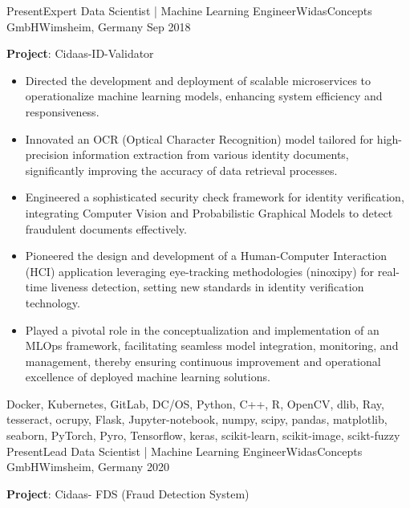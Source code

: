 %
%
%
\begin{experiences}
  \experience
  {Present}{Expert Data Scientist | Machine Learning Engineer}{WidasConcepts GmbH}{Wimsheim, Germany}
  {Sep 2018} {
  \vspace{0.1cm}
  \textbf{Project}: Cidaas-ID-Validator
    \begin{itemize}
    \item Directed the development and deployment of scalable microservices to operationalize machine learning models, enhancing system efficiency and responsiveness.
	\item Innovated an OCR (Optical Character Recognition) model tailored for high-precision information extraction from various identity documents, significantly improving the accuracy of data retrieval processes.
	\item Engineered a sophisticated security check framework for identity verification, integrating Computer Vision and Probabilistic Graphical Models to detect fraudulent documents effectively.
	\item Pioneered the design and development of a Human-Computer Interaction (HCI) application leveraging eye-tracking methodologies (ninoxipy) for real-time liveness detection, setting new standards in identity verification technology.
	\item Played a pivotal role in the conceptualization and implementation of an MLOps framework, facilitating seamless model integration, monitoring, and management, thereby ensuring continuous improvement and operational excellence of deployed machine learning solutions.
    \end{itemize}
  }
    {Docker, Kubernetes, GitLab, DC/OS, Python, C++, R,  OpenCV, dlib, Ray, tesseract, ocrupy, Flask, Jupyter-notebook, numpy, scipy, pandas, matplotlib, seaborn, PyTorch, Pyro, Tensorflow, keras, scikit-learn, scikit-image, scikt-fuzzy}
  \emptySeparator
  \experience
	{Present}{Lead Data Scientist | Machine Learning Engineer}{WidasConcepts GmbH}{Wimsheim, Germany}
	{2020} {
	\vspace{0.1cm}
	\textbf{Project}: Cidaas- FDS (Fraud Detection System)
	\begin{itemize}

\end{itemize}}
\end{experiences}
